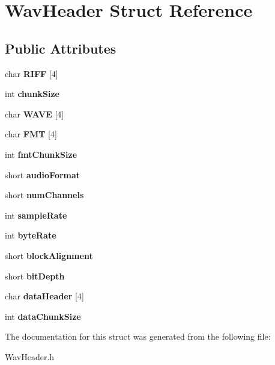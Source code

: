 \hypertarget{structWavHeader}{}\section{Wav\+Header Struct Reference}
\label{structWavHeader}
\subsection*{Public Attributes}
\begin{DoxyCompactItemize}
\item 
\mbox{\label{structWavHeader_a656b55f18ceefdc4e7678d77314237bd}} 
char {\bfseries R\+I\+FF} \mbox{[}4\mbox{]}
\item 
\mbox{\label{structWavHeader_aabec07ac9c8400dfb62e18d23fa6a5c1}} 
int {\bfseries chunk\+Size}
\item 
\mbox{\label{structWavHeader_a09588720e7193c0a523da6325bc17a20}} 
char {\bfseries W\+A\+VE} \mbox{[}4\mbox{]}
\item 
\mbox{\label{structWavHeader_a06a6b5a7d41312b2e4f7c16edd25a905}} 
char {\bfseries F\+MT} \mbox{[}4\mbox{]}
\item 
\mbox{\label{structWavHeader_acb4b8069da647f000862e5c90b92225f}} 
int {\bfseries fmt\+Chunk\+Size}
\item 
\mbox{\label{structWavHeader_af052ba52da4a1bda137ce0171f3d763e}} 
short {\bfseries audio\+Format}
\item 
\mbox{\label{structWavHeader_a974f24ee8f6c0f7a6a881b1b5f917bfa}} 
short {\bfseries num\+Channels}
\item 
\mbox{\label{structWavHeader_a70f6545b7646e8f9c2f02118150566d1}} 
int {\bfseries sample\+Rate}
\item 
\mbox{\label{structWavHeader_ab9c193dd57da1a877cd5193657ed8a75}} 
int {\bfseries byte\+Rate}
\item 
\mbox{\label{structWavHeader_a4460bbfc889fbf2e988970fd39127c4c}} 
short {\bfseries block\+Alignment}
\item 
\mbox{\label{structWavHeader_a2a501acfa50d22cc01a972367e164a77}} 
short {\bfseries bit\+Depth}
\item 
\mbox{\label{structWavHeader_a91c5bef7c13bca1226828e7ca10547a3}} 
char {\bfseries data\+Header} \mbox{[}4\mbox{]}
\item 
\mbox{\label{structWavHeader_a9a984c298b6d88f3097e080f42e9ddc8}} 
int {\bfseries data\+Chunk\+Size}
\end{DoxyCompactItemize}


The documentation for this struct was generated from the following file\+:\begin{DoxyCompactItemize}
\item 
Wav\+Header.\+h\end{DoxyCompactItemize}
